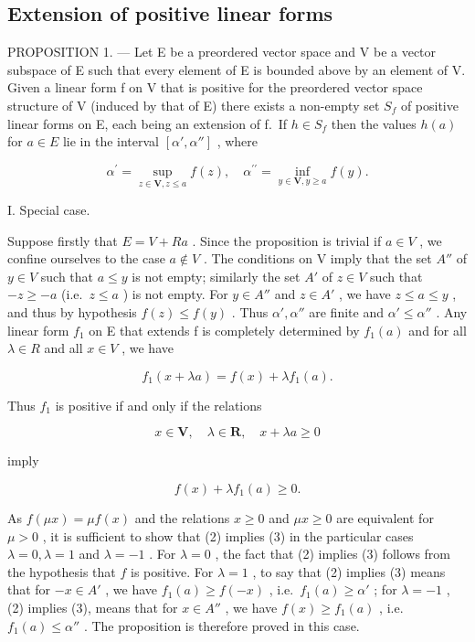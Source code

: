 \subsection{Extension of positive linear forms}

PROPOSITION 1. --- Let E be a preordered vector space and V be a vector subspace of E such that every element of E is bounded above by an element of V. Given a linear form f on V that is positive for the preordered vector space structure of V (induced by that of E) there exists a non-empty set \(S_{f}\) of positive linear forms on E, each being an extension of f.~If \(h \in S_{f}\) then the values \(h(a)\) for \(a \in E\) lie in the interval \([\alpha', \alpha'']\) , where

\[
\alpha^ {\prime} = \sup _ {z \in \mathbf {V}, z \leqslant a} f (z), \quad \alpha^ {\prime \prime} = \inf _ {y \in \mathbf {V}, y \geqslant a} f (y).\tag{1}
\]

I. Special case.

Suppose firstly that \(E = V + R a\) . Since the proposition is trivial if \(a \in V\) , we confine ourselves to the case \(a \notin V\) . The conditions on V imply that the set \(A''\) of \(y \in V\) such that \(a \leqslant y\) is not empty; similarly the set \(A'\) of \(z \in V\) such that \(-z \geqslant -a\) (i.e.~\(z \leqslant a\) ) is not empty. For \(y \in A''\) and \(z \in A'\) , we have \(z \leqslant a \leqslant y\) , and thus by hypothesis \(f(z) \leqslant f(y)\) . Thus \(\alpha', \alpha''\) are finite and \(\alpha' \leqslant \alpha''\) . Any linear form \(f_1\) on E that extends f is completely determined by \(f_1(a)\) and for all \(\lambda \in R\) and all \(x \in V\) , we have

\[
f _ {1} (x + \lambda a) = f (x) + \lambda f _ {1} (a).
\]

Thus \(f_{1}\) is positive if and only if the relations

\[
x \in \mathbf {V}, \quad \lambda \in \mathbf {R}, \quad x + \lambda a \geqslant 0\tag{2}
\]

imply

\[
f (x) + \lambda f _ {1} (a) \geqslant 0.\tag{3}
\]

As \(f(\mu x) = \mu f(x)\) and the relations \(x \geqslant 0\) and \(\mu x \geqslant 0\) are equivalent for \(\mu > 0\) , it is sufficient to show that (2) implies (3) in the particular cases \(\lambda = 0, \lambda = 1\) and \(\lambda = -1\) . For \(\lambda = 0\) , the fact that (2) implies (3) follows from the hypothesis that \(f\) is positive. For \(\lambda = 1\) , to say that (2) implies (3) means that for \(-x \in A'\) , we have \(f_1(a) \geqslant f(-x)\) , i.e.~\(f_1(a) \geqslant \alpha'\) ; for \(\lambda = -1\) , (2) implies (3), means that for \(x \in A''\) , we have \(f(x) \geqslant f_1(a)\) , i.e.~\(f_1(a) \leqslant \alpha''\) . The proposition is therefore proved in this case.

